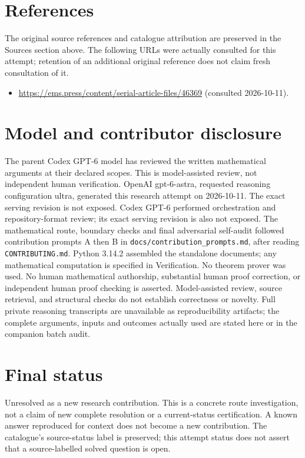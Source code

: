 \documentclass[11pt]{article}
\begin{document}
\section{References}
The original source references and catalogue attribution are preserved in the
Sources section above. The following URLs were actually consulted for this attempt;
retention of an additional original reference does not claim fresh consultation of it.
\begin{itemize}
\item \url{https://ems.press/content/serial-article-files/46369} (consulted 2026-10-11). 
\end{itemize}
\section{Model and contributor disclosure}
The parent Codex GPT-6 model has reviewed the written mathematical arguments at their declared scopes. This is model-assisted review, not independent human verification.
OpenAI gpt-6-astra, requested reasoning configuration ultra, generated this research
attempt on 2026-10-11. The exact serving revision is not exposed. Codex GPT-6
performed orchestration and repository-format review; its exact serving revision
is also not exposed. The mathematical route, boundary checks and final adversarial
self-audit followed contribution prompts A then B in
\texttt{docs/contribution\_prompts.md}, after reading \texttt{CONTRIBUTING.md}.
Python 3.14.2 assembled the standalone documents; any mathematical computation is
specified in Verification. No theorem prover was used. No human mathematical
authorship, substantial human proof correction, or independent human proof checking
is asserted. Model-assisted review, source retrieval, and structural checks do not
establish correctness or novelty. Full private reasoning transcripts are unavailable
as reproducibility artifacts; the complete arguments, inputs and outcomes actually
used are stated here or in the companion batch audit.
\section{Final status}
Unresolved as a new research contribution. This is a concrete route investigation,
not a claim of new complete resolution or a current-status certification. A known
answer reproduced for context does not become a new contribution. The catalogue's
source-status label is preserved; this attempt status does not assert that a
source-labelled solved question is open.
\end{document}
